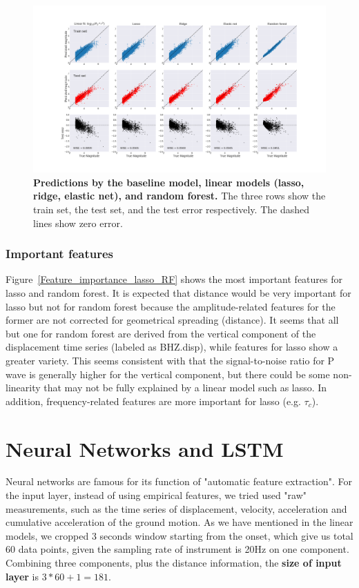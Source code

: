 \documentclass{article} %
\begin{document}
\begin{figure}[ht!]
	\centering
	\includegraphics*[scale=0.18, viewport= 85mm 40mm 800mm 460mm, angle=0]{./figure/prediction_vs_true.png}
	\caption{{\bf Predictions by the baseline model, linear models (lasso, ridge, elastic net), and random forest.} The three rows show the train set, the test set, and the test error respectively. The dashed lines show zero error.}\label{prediction_vs_true} 
\end{figure}


\subsubsection{Important features}
Figure~\ref{Feature_importance_lasso_RF} shows the most important features for lasso and random forest. It is expected that distance would be very important for lasso but not for random forest because the amplitude-related features for the former are not corrected for geometrical spreading (distance). It seems that all but one for random forest are derived from the vertical component of the displacement time series (labeled as BHZ.disp), while features for lasso show a greater variety. This seems consistent with that the signal-to-noise ratio for P wave is generally higher for the vertical component, but there could be some non-linearity that may not be fully explained by a linear model such as lasso. In addition, frequency-related features are more important for lasso (e.g. $\tau_c$).  


\section{Neural Networks and LSTM}
Neural networks are famous for its function of "automatic feature extraction". For the input layer, instead of using empirical features, we tried used "raw" measurements, such as the time series of displacement, velocity, acceleration and cumulative acceleration of the ground motion\cite{Bose2009}. As we have mentioned in the linear models, we cropped 3 seconds window starting from the onset, which give us total 60 data points, given the sampling rate of instrument is 20Hz on one component. Combining three components, plus the distance information, the \textbf{size of input layer} is $3*60 + 1 = 181$. 
\end{document}
